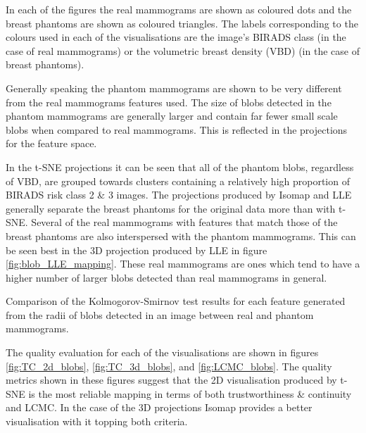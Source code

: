 In each of the figures the real mammograms are shown as coloured dots and the breast phantoms are shown as coloured triangles. The labels corresponding to the colours used in each of the visualisations are the image's BIRADS class (in the case of real mammograms) or the volumetric breast density (VBD) (in the case of breast phantoms).

Generally speaking the phantom mammograms are shown to be very different from the real mammograms features used. The size of blobs detected in the phantom mammograms are generally larger and contain far fewer small scale blobs when compared to real mammograms. This is reflected in the projections for the feature space. 

In the t-SNE projections it can be seen that all of the phantom blobs, regardless of VBD, are grouped towards clusters containing a relatively high proportion of BIRADS risk class 2 \& 3 images. The projections produced by Isomap and LLE generally separate the breast phantoms for the original data more than with t-SNE. Several of the real mammograms with features that match those of the breast phantoms are also interspersed with the phantom mammograms. This can be seen best in the 3D projection produced by LLE in figure \ref{fig:blob_LLE_mapping}. These real mammograms are ones which tend to have a higher number of larger blobs detected than real mammograms in general.

\begin{table}[H]
\label{table:blob_features_ks}
\centering
{}
\caption{Comparison of the Kolmogorov-Smirnov test results for each feature generated from the radii of blobs detected in an image between real and phantom mammograms.}
\end{table}

The quality evaluation for each of the visualisations are shown in figures \ref{fig:TC_2d_blobs}, \ref{fig:TC_3d_blobs}, and \ref{fig:LCMC_blobs}. The quality metrics shown in these figures suggest that the 2D visualisation produced by t-SNE is the most reliable mapping in terms of both trustworthiness \& continuity and LCMC. In the case of the 3D projections Isomap provides a better visualisation with it topping both criteria.

\clearpage

